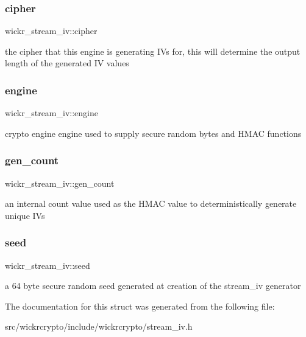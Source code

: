 \subsubsection{\texorpdfstring{cipher}{cipher}}
{\footnotesize\ttfamily wickr\+\_\+stream\+\_\+iv\+::cipher}

the cipher that this engine is generating IV\textquotesingle{}s for, this will determine the output length of the generated IV values \mbox{\label{structwickr__stream__iv_a8c597718ade583db19204df7bfed7e85}} 
\subsubsection{\texorpdfstring{engine}{engine}}
{\footnotesize\ttfamily wickr\+\_\+stream\+\_\+iv\+::engine}

crypto engine engine used to supply secure random bytes and H\+M\+AC functions \mbox{\label{structwickr__stream__iv_ae7d500c34333c546ee044fe875e10dfc}} 
\subsubsection{\texorpdfstring{gen\_count}{gen\_count}}
{\footnotesize\ttfamily wickr\+\_\+stream\+\_\+iv\+::gen\+\_\+count}

an internal count value used as the H\+M\+AC value to deterministically generate unique I\+Vs \mbox{\label{structwickr__stream__iv_a221017bc41b4cc36bf31f13a0c299db1}} 
\subsubsection{\texorpdfstring{seed}{seed}}
{\footnotesize\ttfamily wickr\+\_\+stream\+\_\+iv\+::seed}

a 64 byte secure random seed generated at creation of the stream\+\_\+iv generator 

The documentation for this struct was generated from the following file\+:\begin{DoxyCompactItemize}
\item 
src/wickrcrypto/include/wickrcrypto/stream\+\_\+iv.\+h\end{DoxyCompactItemize}
